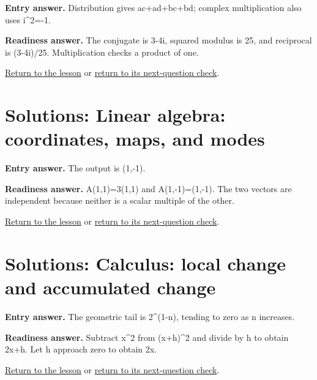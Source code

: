 \label{solution:entry:complex_numbers}

\textbf{Entry answer.} Distribution gives ac+ad+bc+bd; complex multiplication also uses i\textasciicircum{}2=-1.\par

\label{solution:ready:complex_numbers}

\textbf{Readiness answer.} The conjugate is 3-4i, squared modulus is 25, and reciprocal is (3-4i)/25. Multiplication checks a product of one.\par

\hyperref[learn:complex_numbers]{Return to the lesson} or \hyperref[readiness:complex_numbers]{return to its next-question check}.

\section{Solutions: Linear algebra: coordinates, maps, and modes}

\label{solution:entry:linear_algebra}

\textbf{Entry answer.} The output is (1,-1).\par

\label{solution:ready:linear_algebra}

\textbf{Readiness answer.} A(1,1)=3(1,1) and A(1,-1)=(1,-1). The two vectors are independent because neither is a scalar multiple of the other.\par

\hyperref[learn:linear_algebra]{Return to the lesson} or \hyperref[readiness:linear_algebra]{return to its next-question check}.

\section{Solutions: Calculus: local change and accumulated change}

\label{solution:entry:calculus}

\textbf{Entry answer.} The geometric tail is 2\textasciicircum{}(1-n), tending to zero as n increases.\par

\label{solution:ready:calculus}

\textbf{Readiness answer.} Subtract x\textasciicircum{}2 from (x+h)\textasciicircum{}2 and divide by h to obtain 2x+h. Let h approach zero to obtain 2x.\par

\hyperref[learn:calculus]{Return to the lesson} or \hyperref[readiness:calculus]{return to its next-question check}.

